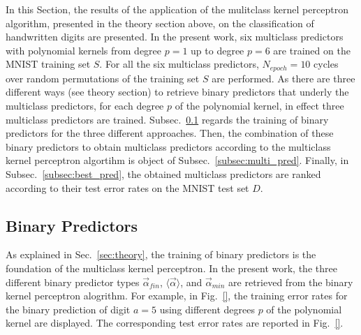 In this Section, the results of the application of the mulitclass kernel perceptron algorithm, presented in the theory section above, on the classification of handwritten digits are presented. In the present work, six multiclass predictors with polynomial kernels from degree $p=1$ up to degree $p=6$ are trained on the MNIST training set $S$. For all the six multiclass predictors, $N_{epoch} = 10$ cycles over random permutations of the training set $S$ are performed. As there are three different ways (see theory section) to retrieve binary predictors that underly the multiclass predictors, for each degree $p$ of the polynomial kernel, in effect three multiclass predictors are trained. Subsec.~\ref{subsec:bin_pred} regards the training of binary predictors for the three different approaches. Then, the combination of these binary predictors to obtain multiclass predictors according to the multiclass kernel perceptron algortihm is object of Subsec.~\ref{subsec:multi_pred}. Finally, in Subsec.~\ref{subsec:best_pred}, the obtained multiclass predictors are ranked according to their test error rates on the MNIST test set $D$. 

\subsection{Binary Predictors}\label{subsec:bin_pred}
As explained in Sec.~\ref{sec:theory}, the training of binary predictors is the foundation of the multiclass kernel perceptron. In the present work, the three different binary predictor types $\vec{\alpha}_{fin}$, $\langle \vec{\alpha} \rangle$, and $\vec{\alpha}_{min}$ are retrieved from the binary kernel perceptron alogrithm. For example, in Fig.~\ref{}, the training error rates for the binary prediction of digit $a=5$ using different degrees $p$ of the polynomial kernel are displayed. The corresponding test error rates are reported in Fig.~\ref{}. 

